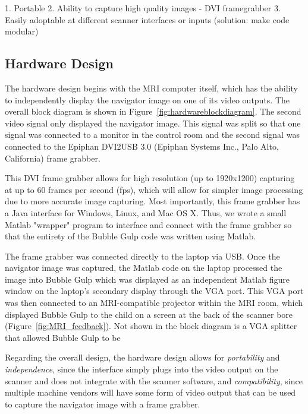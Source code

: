 1. Portable
2. Ability to capture high quality images - DVI framegrabber
3. Easily adoptable at different scanner interfaces or inputs (solution: make code modular)

\subsection{Hardware Design}
	The hardware design begins with the MRI computer itself, which has the ability to independently display the navigator image on one of its video outputs. The overall block diagram is shown in Figure~\ref{fig:hardwareblockdiagram}. The second video signal only displayed the navigator image. This signal was split so that one signal was connected to a monitor in the control room and the second signal was connected to the Epiphan DVI2USB 3.0 (Epiphan Systems Inc., Palo Alto, California) frame grabber.
	
	This DVI frame grabber allows for high resolution (up to 1920x1200) capturing at up to 60 frames per second (fps), which will allow for simpler image processing due to more accurate image capturing. Most importantly, this frame grabber has a Java interface for Windows, Linux, and Mac OS X. Thus, we wrote a small Matlab "wrapper" program to interface and connect with the frame grabber so that the entirety of the Bubble Gulp code was written using Matlab.
	
	The frame grabber was connected directly to the laptop via USB. Once the navigator image was captured, the Matlab code on the laptop processed the image into Bubble Gulp which was displayed as an independent Matlab figure window on the laptop's secondary display through the VGA port. This VGA port was then connected to an MRI-compatible projector within the MRI room, which displayed Bubble Gulp to the child on a screen at the back of the scanner bore (Figure~\ref{fig:MRI_feedback}). Not shown in the block diagram is a VGA splitter that allowed Bubble Gulp to be 
	
	Regarding the overall design, the hardware design allows for \textit{portability} and \textit{independence}, since the interface simply plugs into the video output on the scanner and does not integrate with the scanner software, and \textit{compatibility}, since multiple machine vendors will have some form of video output that can be used to capture the navigator image with a frame grabber.
	
